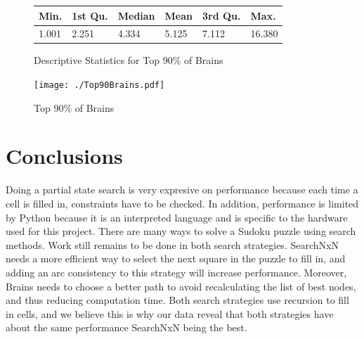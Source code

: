 \documentclass[letterpaper]{article}
\begin{document}
\begin{figure}[h]
	\centering
	\begin{tabular}{|l|l|l|l|l|l|}
		\hline
		Min. & 1st Qu.  & Median & Mean & 3rd Qu. & Max.\\
		\hline
		  1.001  & 2.251 &  4.334  & 5.125 & 7.112 & 16.380\\
		\hline
	\end{tabular}
	\caption{Descriptive Statistics for Top 90\% of Brains}
	\label{fig: 90_perc_brains_table}
\end{figure}

\begin{figure}[h]
	\centering
	\texttt{[image: ./Top90Brains.pdf]}
	\caption{Top 90\% of Brains}
	\label{fig: 90_perc_brains_dist}
\end{figure}

\section{Conclusions}
Doing a partial state search is very expresive on performance because each time a cell is filled in, constraints have to be checked. In addition, performance is limited by Python because it is an interpreted language and is specific to the hardware used for this project. There are many ways to solve a Sudoku puzzle using search methods. Work still remains to be done in both search strategies. SearchNxN needs a more efficient way to select the next square in the puzzle to fill in, and adding an arc consistency to this strategy will increase performance. Moreover, Brains needs to choose a better path to avoid recalculating the list of best nodes, and thus reducing computation time. Both search strategies use recursion to fill in cells, and we believe this is why our data reveal that both strategies have about the same performance SearchNxN being the best.
\end{document}
